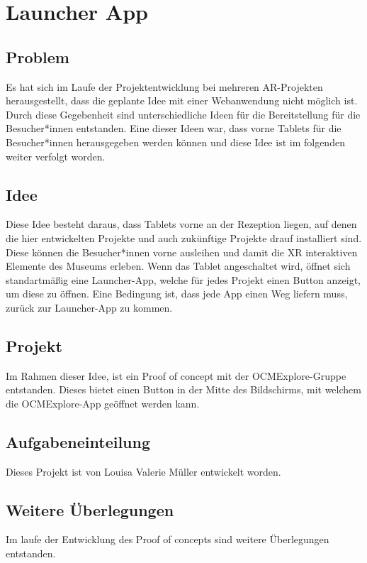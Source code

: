 \chapter{Launcher App}

\section{Problem}
Es hat sich im Laufe der Projektentwicklung bei mehreren AR-Projekten herausgestellt, dass die geplante Idee mit einer Webanwendung nicht möglich ist. Durch diese Gegebenheit sind unterschiedliche Ideen für die Bereitstellung für die Besucher*innen entstanden. Eine dieser Ideen war, dass vorne Tablets für die Besucher*innen herausgegeben werden können und diese Idee ist im folgenden weiter verfolgt worden.

\section{Idee}
Diese Idee besteht daraus, dass Tablets vorne an der Rezeption liegen, auf denen die hier entwickelten Projekte und auch zukünftige Projekte drauf installiert sind. Diese können die Besucher*innen vorne ausleihen und damit die XR interaktiven Elemente des Museums erleben. Wenn das Tablet angeschaltet wird, öffnet sich standartmäßig eine Launcher-App, welche für jedes Projekt einen Button anzeigt, um diese zu öffnen. Eine Bedingung ist, dass jede App einen Weg liefern muss, zurück zur Launcher-App zu kommen.

\section{Projekt}
Im Rahmen dieser Idee, ist ein Proof of concept mit der OCMExplore-Gruppe entstanden. Dieses bietet einen Button in der Mitte des Bildschirms, mit welchem die OCMExplore-App geöffnet werden kann.

\section{Aufgabeneinteilung}
Dieses Projekt ist von Louisa Valerie Müller entwickelt worden.

\section{Weitere Überlegungen}
Im laufe der Entwicklung des Proof of concepts sind weitere Überlegungen entstanden.

